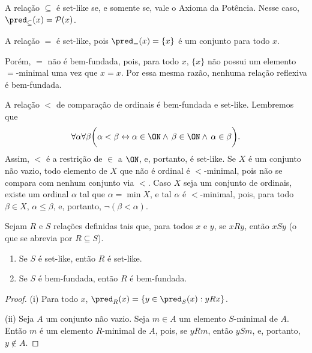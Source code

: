 \begin{example}[$\BST$]
    A relação $\subseteq$ é set-like se, e somente se, vale o Axioma da Potência.
    Nesse caso, $\pred_{\subseteq}(x)=\mathcal{P}(x)$.
\end{example}

\begin{example}[$\BST$]
    A relação $=$ é set-like, pois $\pred_{=}(x)=\{x\}$ é um conjunto para todo $x$.

    Porém, $=$ não é bem-fundada, pois, para todo $x$, $\{x\}$ não possui um elemento $=$-minimal uma vez que $x = x$.
    Por essa mesma razão, nenhuma relação reflexiva é bem-fundada.
\end{example}

\begin{example}
    A relação $<$ de comparação de ordinais é bem-fundada e set-like.
    Lembremos que
    \[
        \forall \alpha \forall \beta\bigg(\alpha<\beta \leftrightarrow \alpha\in \ON \land\, \beta\in \ON \land\, \alpha\in \beta\bigg).
    \]
    Assim, $<$ é a restrição de $\in$ a $\ON$, e, portanto, é set-like.
    Se $X$ é um conjunto não vazio, todo elemento de $X$ que não é ordinal é $<$-minimal, pois não se compara com nenhum conjunto via $<$.
    Caso $X$ seja um conjunto de ordinais, existe um ordinal $\alpha$ tal que $\alpha=\min X$, e tal $\alpha$ é $<$-minimal, pois, para todo $\beta\in X$, $\alpha\leq \beta$, e, portanto, $\neg(\beta<\alpha)$.
\end{example}

\begin{proposition}[$\BST$]\label{prop:relacoesComparaveis}
    Sejam $R$ e $S$ relações definidas tais que, para todos $x$ e $y$, se $x R y$, então $x S y$ (o que se abrevia por $R\subseteq S$).
    \begin{enumerate}[label=(\roman*)]
        \item Se $S$ é set-like, então $R$ é set-like.
        \item Se $S$ é bem-fundada, então $R$ é bem-fundada.
    \end{enumerate}
\end{proposition}
\begin{proof}
    (i) Para todo $x$, $\pred_{R}(x)=\{y\in \pred_{S}(x): y R x\}$.

    (ii) Seja $A$ um conjunto não vazio.
    Seja $m\in A$ um elemento $S$-minimal de $A$.
    Então $m$ é um elemento $R$-minimal de $A$, pois, se $y R m$, então $y S m$, e, portanto, $y\notin A$.
\end{proof}

